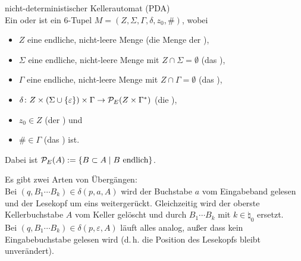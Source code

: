 \linie

\begin{Def}{nicht-deterministischer Kellerautomat (PDA)}\\
    Ein  oder
    ist ein $6$-Tupel $M = (Z, \Sigma, \Gamma, \delta, z_0, \#)$, wobei
    \begin{itemize}
        \item
        $Z$ eine endliche, nicht-leere Menge
        (die Menge der ),

        \item
        $\Sigma$ eine endliche, nicht-leere Menge
        mit $Z \cap \Sigma = \emptyset$
        (das ),

        \item
        $\Gamma$ eine endliche, nicht-leere Menge
        mit $Z \cap \Gamma = \emptyset$
        (das ),

        \item
        $\delta\colon Z \times (\Sigma \cup \{\varepsilon\}) \times \Gamma
        \rightarrow \P_E(Z \times \Gamma^\ast)$
        (die ),

        \item
        $z_0 \in Z$ (der ) und

        \item
        $\# \in \Gamma$ (das ) ist.
    \end{itemize}
    Dabei ist $\P_E(A) := \{B \subset A \;|\; B \text{ endlich}\}$.
\end{Def}

\begin{Bem}
    Es gibt zwei Arten von Übergängen:\\
    Bei 
    $(q, B_1 \dotsb B_k) \in \delta(p, a, A)$
    wird der Buchstabe $a$ vom Eingabeband gelesen und der Lesekopf um
    eins weitergerückt.
    Gleichzeitig wird der oberste Kellerbuchstabe $A$ vom Keller gelöscht und
    durch $B_1 \dotsb B_k$ mit $k \in \natural_0$ ersetzt.\\
    Bei 
    $(q, B_1 \dotsb B_k) \in \delta(p, \varepsilon, A)$
    läuft alles analog, außer dass kein Eingabebuchstabe gelesen wird
    (d.\,h. die Position des Lesekopfs bleibt unverändert).
\end{Bem}

